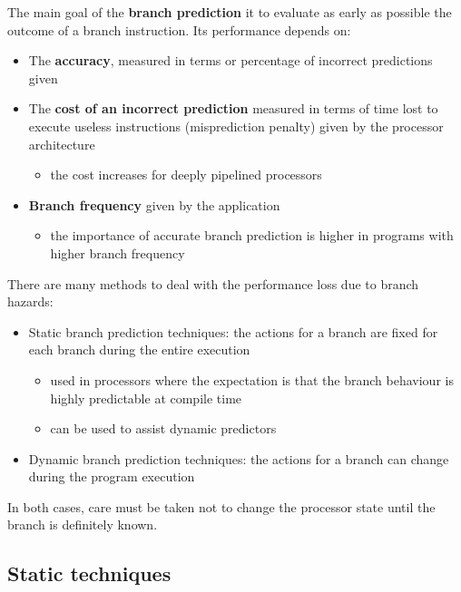\documentclass[english]{article}
\begin{document}
The main goal of the \textbf{branch prediction} it to evaluate as early as possible the outcome of a branch instruction.
Its performance depends on:

\begin{itemize}
  \item The \textbf{accuracy}, measured in terms or percentage of incorrect predictions given
  \item The \textbf{cost of an incorrect prediction} measured in terms of time lost to execute useless instructions (misprediction penalty) given by the processor architecture
        \begin{itemize}
          \item the cost increases for deeply pipelined processors
        \end{itemize}
  \item \textbf{Branch frequency} given by the application
        \begin{itemize}
          \item the importance of accurate branch prediction is higher in programs with higher branch frequency
        \end{itemize}
\end{itemize}

There are many methods to deal with the performance loss due to branch hazards:

\begin{itemize}
  \item Static branch prediction techniques: the actions for a branch are fixed for each branch during the entire execution
        \begin{itemize}
          \item used in processors where the expectation is that the branch behaviour is highly predictable at compile time
          \item can be used to assist dynamic predictors
        \end{itemize}
  \item Dynamic branch prediction techniques: the actions for a branch can change during the program execution
\end{itemize}

In both cases, care must be taken not to change the processor state until the branch is definitely known.

\subsection{Static techniques}
\end{document}

